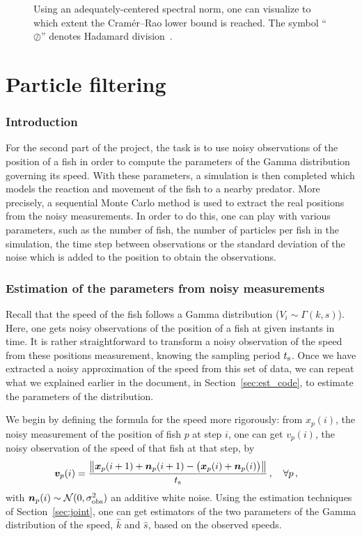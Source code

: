 \documentclass[final]{aomart}
\newtheorem[{}\it]{thm}{Theorem}[section]
\theoremstyle{definition}
\newtheorem*[{}\it]{notation}{Notation}
\numberwithin{equation}{section}
\newcommand{\ts}{t_\textnormal{s}}
\newcommand{\enVert}[1]{\left\lVert#1\right\rVert}
\let\norm=\enVert
\begin{document}
\begin{figure}[!htbp]
	\centering
	\scalebox{0.75}{}
	\caption{Using an adequately-centered spectral norm, one can visualize to which extent the Cramér--Rao lower bound is reached.
	The symbol ``\(\oslash\)'' denotes Hadamard division~\cite{wiki:hadamard}.}
	\label{fig:CRLB}
\end{figure}

\part{Particle filtering}

\section{Introduction}
For the second part of the project, the task is to use noisy observations of the position of a fish in order to compute the parameters of the Gamma distribution governing its speed.
With these parameters, a simulation is then completed which models the reaction and movement of the fish to a nearby predator.
More precisely, a sequential Monte Carlo method is used to extract the real positions from the noisy measurements.
In order to do this, one can play with various parameters, such as the number of fish, the number of particles per fish in the simulation, the time step between observations or the standard deviation of the noise which is added to the position to obtain the observations.

\section{Estimation of the parameters from noisy measurements}
\label{sec:speed}
Recall that the speed of the fish follows a Gamma distribution (\(V_i \sim \Gamma(k, s)\)).
Here, one gets noisy observations of the position of a fish at given instants in time.
It is rather straightforward to transform a noisy observation of the speed from these positions measurement, knowing the sampling period \(\ts\).
Once we have extracted a noisy approximation of the speed from this set of data, we can repeat what we explained earlier in the document, in Section~\ref{sec:est_code}, to estimate the parameters of the distribution.

We begin by defining the formula for the speed more rigorously: from \(x_p(i)\), the noisy measurement of the position of fish \(p\) at step $i$, one can get \(v_p(i)\), the noisy observation of the speed of that fish at that step, by
\begin{align}
	\bm{v}_p(i) &= \frac{\norm{\bm{x}_p(i+1) + \bm{n}_p(i+1) - \big(\bm{x}_p(i) + \bm{n}_p(i)\big)}}{\ts}\,, \quad \forall p\,,\label{eq:speed}
\end{align}
with \(\bm{n}_p(i) \sim \mathcal{N}(0, \sigma^2_{\textnormal{obs}})\) an additive white noise.
Using the estimation techniques of Section~\ref{sec:joint}, one can get estimators of the two parameters of the Gamma distribution of the speed, \(\hat{k}\) and \(\hat{s}\), based on the observed speeds.
\end{document}
